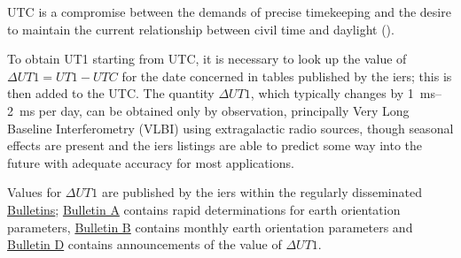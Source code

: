 UTC is a compromise between the demands of precise timekeeping and the desire to 
maintain the current relationship between civil time and daylight (\cite{SOFA20210125}).

To obtain UT1 starting from UTC, it is necessary to look up the value of 
\( \Delta UT1 = UT1 - UTC \) for the date concerned in tables published by the 
\gls{iers}; this is then 
added to the UTC. The quantity \(\Delta UT1\), which typically changes by \SIrange{1}{2}{\milli\second} 
per day, can be obtained only by observation, principally Very Long Baseline
Interferometry (VLBI) using extragalactic radio sources, though seasonal effects 
are present and the \gls{iers} listings are able to predict some way into the future 
with adequate accuracy for most applications.

Values for \( \Delta UT1 \) are published by the \gls{iers} within the regularly disseminated 
\href{https://www.iers.org/IERS/EN/Publications/Bulletins/bulletins.html}{Bulletins}; 
\href{https://datacenter.iers.org/productMetadata.php?id=6}{Bulletin A} contains 
rapid determinations for earth orientation parameters, \href{https://datacenter.iers.org/productMetadata.php?id=207}{Bulletin B} contains monthly earth orientation parameters and 
\href{https://datacenter.iers.org/productMetadata.php?id=17}{Bulletin D} contains 
announcements of the value of \( \Delta UT1 \).
